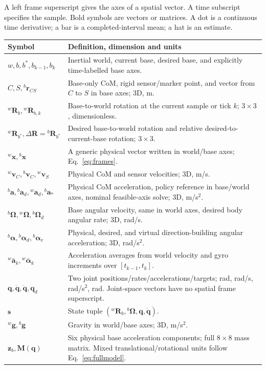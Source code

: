 \documentclass[11pt,a4paper]{article}
\newcommand{\vct}[1]{\boldsymbol{#1}}
\newcommand{\mat}[1]{\mathbf{#1}}
\newcommand{\bv}[1]{{}^{b}\vct{#1}}
\newcommand{\wv}[1]{{}^{w}\vct{#1}}
\newcommand{\Rw}{{}^{w}\mat R_b}
\newcommand{\Rk}[1]{{}^{w}\mat R_{b,#1}}
\begin{document}
A left frame superscript gives the axes of a spatial vector. A time subscript
specifies the sample. Bold symbols are vectors or matrices. A dot is a continuous
time derivative; a bar is a completed-interval mean; a hat is an estimate.

\small
\begin{longtable}{L{4.2cm}L{10.5cm}}
\toprule Symbol & Definition, dimension and units\\\midrule\endhead
$w,b,b^*,b_{k-1},b_k$ & Inertial world, current base, desired base, and explicitly time-labelled base axes.\\
$C,S,\bv r_{CS}$ & Base-only CoM, rigid sensor/marker point, and vector from $C$ to $S$ in base axes; 3D, m.\\
$\Rw,\Rk{k}$ & Base-to-world rotation at the current sample or tick $k$; $3\times3$, dimensionless.\\
${}^w\mat R_{b^*},\Delta\mat R={}^b\mat R_{b^*}$ & Desired base-to-world rotation and relative desired-to-current-base rotation; $3\times3$.\\
$\wv x,\bv x$ & A generic physical vector written in world/base axes; Eq.~\eqref{eq:frames}.\\
$\wv v_C,\bv v_C,\wv v_S$ & Physical CoM and sensor velocities; 3D, m/s.\\
$\bv a,\bv a_d,\wv a_d,\bv a_*$ & Physical CoM acceleration, policy reference in base/world axes, nominal feasible-axis solve; 3D, m/s$^2$.\\
$\bv\Omega,\wv\Omega,\bv\Omega_d$ & Base angular velocity, same in world axes, desired body angular rate; 3D, rad/s.\\
$\bv\alpha,\bv\alpha_d,\bv\alpha_v$ & Physical, desired, and virtual direction-building angular acceleration; 3D, rad/s$^2$.\\
$\wv{\bar a}_k,\wv{\bar\alpha}_k$ & Acceleration averages from world velocity and gyro increments over $[t_{k-1},t_k]$.\\
$\vct q,\dot{\vct q},\ddot{\vct q},\vct q_d$ & Two joint positions/rates/accelerations/targets; rad, rad/s, rad/s$^2$, rad. Joint-space vectors have no spatial frame superscript.\\
$\vct s$ & State tuple $(\Rw,\bv\Omega,\vct q,\dot{\vct q})$.\\
$\wv g,\bv g$ & Gravity in world/base axes; 3D, m/s$^2$.\\
$\vct z_b,\mat M(\vct q)$ & Six physical base acceleration components; full $8\times8$ mass matrix. Mixed translational/rotational units follow Eq.~\eqref{eq:fullmodel}.\\

\end{longtable}
\end{document}
